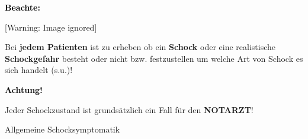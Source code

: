 \documentclass{article}
\newcommand\gEs[1]{\textbf{\textcolor[rgb]{0.0,0.0,0.5019608}{#1}}}
\newcommand\gEs[1]{\textbf{\textcolor[rgb]{0.0,0.0,0.5019608}{#1}}}
\newcommand\gCa[1]{\textbf{\textcolor{black}{#1}}}
\begin{document}
{\mdseries\color{black}
\gCa{Beachte:} }

\begin{center}
 [Warning: Image ignored] %

\end{center}
{\centering\color{black}
Bei \gEs{jedem Patienten} ist zu erheben ob ein
\gEs{Schock} oder eine realistische
\gEs{Schockgefahr} besteht oder nicht bzw.
festzustellen um welche Art von Schock es sich handelt (s.u.)!
\par}

{\color{black}
\gCa{Achtung!}}

{\centering\color{black}
Jeder Schockzustand ist grunds\"atzlich ein Fall f\"ur den
\gEs{NOTARZT}!
\par}

{\mdseries\color{black}
Allgemeine Schocksymptomatik}
\end{document}
